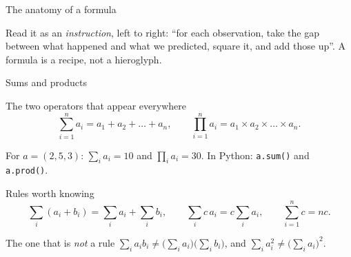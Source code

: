 \documentclass[aspectratio=169,11pt]{beamer}
\begin{document}
\begin{frame}{The anatomy of a formula}
  \begin{center}
  \end{center}
  \begin{takeaway}
    Read it as an \emph{instruction}, left to right: ``for each observation,
    take the gap between what happened and what we predicted, square it, and
    add those up''. A formula is a recipe, not a hieroglyph.
  \end{takeaway}
\end{frame}

\begin{frame}{Sums and products}
  \footnotesize
  \begin{block}{The two operators that appear everywhere}
    \[
      \sum_{i=1}^{n} a_i = a_1 + a_2 + \dots + a_n,
      \qquad
      \prod_{i=1}^{n} a_i = a_1 \times a_2 \times \dots \times a_n .
    \]
  \end{block}
  \begin{numexample}
    For $a = (2, 5, 3)$: $\sum_i a_i = 10$ and $\prod_i a_i = 30$.
    In Python: \texttt{a.sum()} and \texttt{a.prod()}.
  \end{numexample}
  \begin{block}{Rules worth knowing}
    \[
      \sum_i (a_i + b_i) = \sum_i a_i + \sum_i b_i,
      \qquad
      \sum_i c\,a_i = c\sum_i a_i,
      \qquad
      \sum_{i=1}^{n} c = nc .
    \]
  \end{block}
  \begin{alertblock}{The one that is \emph{not} a rule}
    $\sum_i a_i b_i \ne \bigl(\sum_i a_i\bigr)\bigl(\sum_i b_i\bigr)$, and
    $\sum_i a_i^2 \ne \bigl(\sum_i a_i\bigr)^2$.
  \end{alertblock}
\end{frame}
\end{document}
